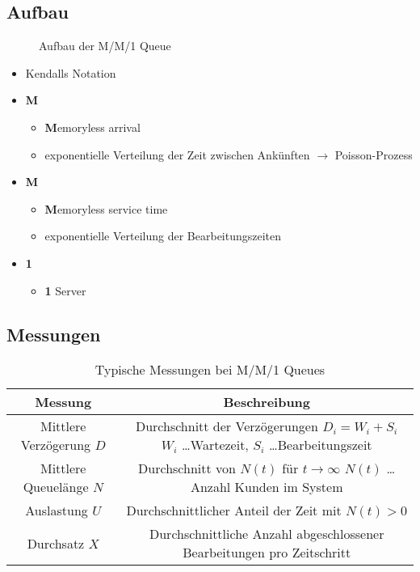 \documentclass[nonacm=true, language=german]{acmart}
\begin{document}
\subsection{Aufbau}

\begin{figure}[ht]
    \centering
    
    \caption{Aufbau der M/M/1 Queue}
    \label{fig:mm1_queue}
\end{figure}

\begin{itemize}
    \item Kendalls Notation
    \item \textbf{M}
    \begin{itemize}
        \item \textbf{M}emoryless arrival
        \item exponentielle Verteilung der Zeit zwischen Ankünften $\rightarrow$ Poisson-Prozess
    \end{itemize}
    \item \textbf{M}
    \begin{itemize}
        \item \textbf{M}emoryless service time
        \item exponentielle Verteilung der Bearbeitungszeiten
    \end{itemize}
    \item \textbf{1}
    \begin{itemize}
        \item \textbf{1} Server
    \end{itemize}
\end{itemize}

\subsection{Messungen}

\begin{table}[ht]
    \centering
    \begin{tabular}{c|c}
        \toprule
        Messung                     & Beschreibung \\
        \midrule
        Mittlere Verzögerung $D$    & \makecell{Durchschnitt der Verzögerungen $ D_i = W_i + S_i $ \\ $W_i$ \dots Wartezeit, $S_i$ \dots Bearbeitungszeit} \\
        Mittlere Queuelänge $N$     & \makecell{Durchschnitt von $N(t)$ für $ t \rightarrow \infty $ \\ $N(t)$ \dots Anzahl Kunden im System} \\
        Auslastung $U$              & Durchschnittlicher Anteil der Zeit mit $ N(t) > 0 $ \\
        Durchsatz $X$               & Durchschnittliche Anzahl abgeschlossener Bearbeitungen pro Zeitschritt \\
        \bottomrule
    \end{tabular}
    \caption{Typische Messungen bei M/M/1 Queues}
    \label{tab:mm1_measures}
\end{table}
\end{document}

